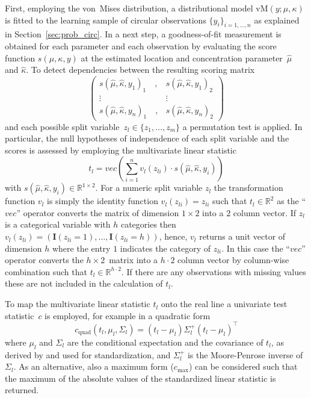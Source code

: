 \documentclass[nojss,shortnames]{jss}
\newcommand{\I}{\mathbf{I}}
\numberwithin{equation}{section}
\begin{document}
\begin{appendix}
First, employing the von~Mises distribution, a distributional model
$\text{vM}(y; \mu,\kappa)$ is fitted to the learning sample of circular
observations $\{y_i\}_{i = 1,\ldots,n}$ as explained in
Section~\ref{sec:prob_circ}. In a next step, a goodness-of-fit measurement is
obtained for each parameter and each observation by evaluating the score
function $s(\mu, \kappa, y)$ at the estimated location and concentration
parameter~$\hat{\mu}$ and $\hat{\kappa}$. To detect dependencies between the
resulting scoring matrix
\begin{equation}
\begin{pmatrix} 
s(\hat{\mu}, \hat{\kappa}, y_1)_1 \quad, & s(\hat{\mu}, \hat{\kappa}, y_1)_2\\
\vdots & \vdots\\
s(\hat{\mu}, \hat{\kappa}, y_n)_1 \quad,& s(\hat{\mu}, \hat{\kappa}, y_n)_2
\end{pmatrix}
\end{equation}
and each possible split variable~\mbox{$z_l \in \{z_1, \ldots, z_m\}$} a permutation
test is applied. In particular, the null hypotheses of independence of each
split variable and the scores is assessed by employing the multivariate linear
statistic
\begin{equation}
t_l = vec\left(\sum_{i=1}^n v_l(z_{li}) \cdot s(\hat{\mu}, \hat{\kappa}, y_i)\right)
\end{equation}
with $s(\hat{\mu}, \hat{\kappa}, y_i) \in \mathbb{R}^{1\times 2}$. For a
numeric split variable $z_l$ the transformation function $v_l$ is simply the
identity function $v_l(z_{li}) = z_{li}$ such that $t_l \in \mathbb{R}^2$ as
the ``$vec$'' operator converts the matrix of dimension $1 \times 2$ into a $2$
column vector. If $z_l$ is a categorical variable with $h$ categories then
$v_l(z_{li}) = (\I(z_{li} = 1), \ldots, \I(z_{li} = h))$, hence, $v_l$ returns
a unit vector of dimension $h$ where the entry $1$ indicates the category of
$z_{li}$. In this case the ``$vec$'' operator converts the $h \times 2$~matrix
into a $h \cdot 2$ column vector by column-wise combination such that $t_l \in
\mathbb{R}^{h \cdot 2}$. If there are any observations with missing values
these are not included in the calculation of $t_l$.

To map the multivariate linear statistic $t_l$ onto the real line a univariate
test statistic~$c$ is employed, for example in a quadratic form
\begin{equation}
c_{\text{quad}}(t_l,\mu_l,\Sigma_l) = (t_l-\mu_l)\Sigma_l^+(t_l-\mu_l)^{\top}
\end{equation}
where $\mu_l$ and $\Sigma_l$ are the conditional expectation and the covariance
of $t_l$, as derived by \cite{Strasser+Weber:1999} and used for
standardization, and $\Sigma_l^+$ is the Moore-Penrose inverse of $\Sigma_l$.
As an alternative, also a maximum form ($c_{\text{max}}$) can be considered
such that the maximum of the absolute values of the standardized linear
statistic is returned.


\end{appendix}
\end{document}
